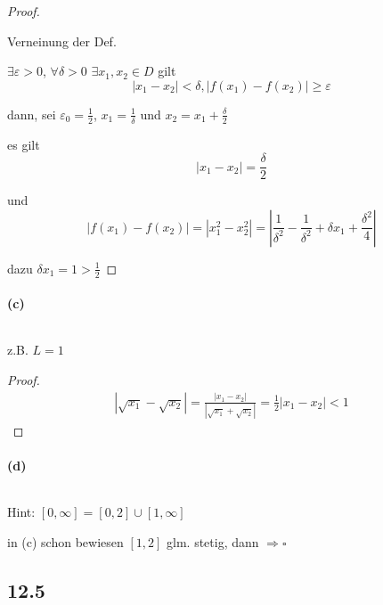 \begin{proof}
$ $\newline

Verneinung der Def.

$\exists \varepsilon>0$, $\forall\delta>0$ $\exists x_1,x_2\in D$ gilt
\begin{equation*}
|x_1-x_2|<\delta,|f(x_1)-f(x_2)|\geq\varepsilon
\end{equation*}

dann, sei $\varepsilon_0=\frac{1}{2}$, $x_1=\frac{1}{\delta}$ und $x_2=x_1+\frac{\delta}{2}$

es gilt
\begin{equation*}
|x_1-x_2|=\frac{\delta}{2}
\end{equation*}

und
\begin{equation*}
|f(x_1)-f(x_2)|=|x_1^2-x_2^2|=|\frac{1}{\delta^2}-\frac{1}{\delta^2}+\delta x_1+\frac{\delta^2}{4}|
\end{equation*}

dazu $\delta x_1=1>\frac{1}{2}$

\end{proof}

\paragraph{(c)}
$ $\newline

z.B. $L=1$

\begin{proof}
\begin{align*}
|\sqrt{x_1}-\sqrt{x_2}|=\frac{|x_1-x_2|}{|\sqrt{x_1}+\sqrt{x_2}|}=\frac{1}{2}|x_1-x_2|<1
\end{align*}
\end{proof}

\newpage

\paragraph{(d)}
$ $\newline

Hint: $[0,\infty]=[0,2]\cup[1,\infty]$

in (c) schon bewiesen $[1,2]$ glm. stetig, dann $\Rightarrow \square$

\subsection{12.5}

